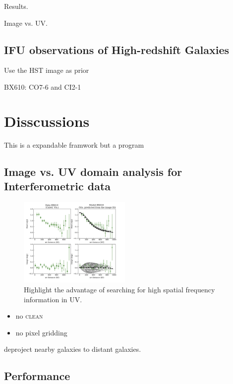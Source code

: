 \documentclass[twocolumn,tighten]{aastex62}
\newcommand{\clean}{{\scshape clean}}
\begin{document}
Results.

Image vs. UV.

\subsection{IFU observations of High-redshift Galaxies}


Use the HST image as prior

\citet{Tacchella:2018aa}



BX610: CO7-6 and CI2-1


\section{Disscussions}

This is a expandable framwork but a program
\subsection{Image vs. UV domain analysis for Interferometric data}

\begin{figure}%
\centering
\includegraphics[width=0.48\textwidth]{figures/bx610-uvcont.png}
\caption{Highlight the advantage of searching for high spatial frequency information in UV.
}
\end{figure}

\begin{itemize}

\item no \clean\ 

\item no pixel gridding

\end{itemize}

deproject nearby galaxies to distant galaxies.

\subsection{Performance}
\end{document}
